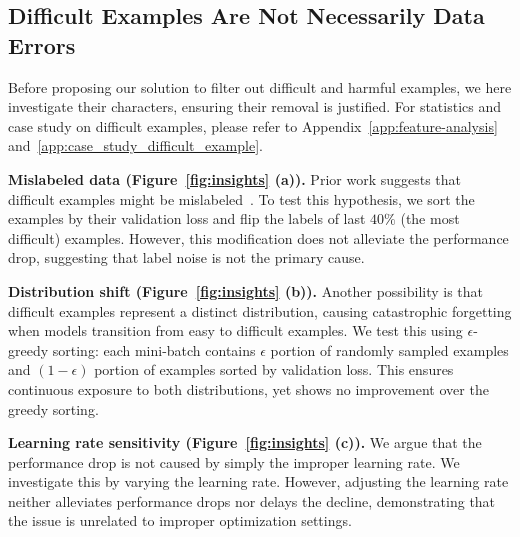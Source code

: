 \subsection{Difficult Examples Are Not Necessarily Data Errors}
\label{sec:insights}
Before proposing our solution to filter out difficult and harmful examples, we here investigate their characters, ensuring their removal is justified. For statistics and case study on difficult examples, please refer to Appendix~\ref{app:feature-analysis} and~\ref{app:case_study_difficult_example}. 

\textbf{Mislabeled data (Figure~\ref{fig:insights} (a)).} Prior work suggests that difficult examples might be mislabeled~\cite{ultrafeedback_preferences,notus2023}. To test this hypothesis, we sort the examples by their validation loss and flip the labels of last $40\%$ (the most difficult) examples. However, this modification does not alleviate the performance drop, suggesting that label noise is not the primary cause.

\textbf{Distribution shift (Figure~\ref{fig:insights} (b)).} 
Another possibility is that difficult examples represent a distinct distribution, causing catastrophic forgetting when models transition from easy to difficult examples. We test this using $\epsilon$-greedy sorting: each mini-batch contains $\epsilon$ portion of randomly sampled examples and $(1-\epsilon)$ portion of examples sorted by validation loss. This ensures continuous exposure to both distributions, yet shows no improvement over the greedy sorting.

\textbf{Learning rate sensitivity (Figure~\ref{fig:insights} (c)).}
We argue that the performance drop is not caused by simply the improper learning rate. We investigate this by varying the learning rate.  However, adjusting the learning rate neither alleviates performance drops nor delays the decline, demonstrating that the issue is unrelated to improper optimization settings.

